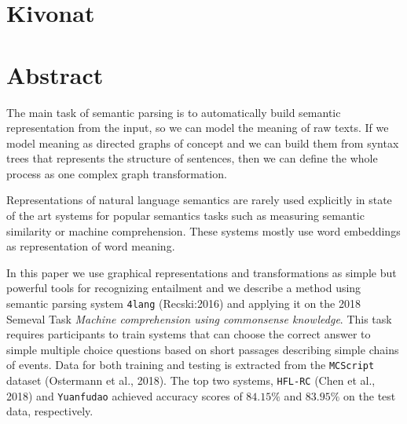 \chapter*{Kivonat}



\vfill

\chapter*{Abstract}
The main task of semantic parsing is to automatically build semantic representation from the input, so we can model the meaning
of raw texts. If we model meaning as directed graphs of concept and we can build them from syntax trees that represents the structure of 
sentences, then we can define the whole process as one complex graph transformation.

Representations of natural language semantics
are rarely used explicitly in state of the art systems
for popular semantics tasks such as measuring semantic
similarity or machine comprehension. These systems mostly use word embeddings as representation of word meaning.

In this paper we use graphical representations and transformations as simple but powerful tools for recognizing entailment and we describe a method using semantic parsing system \texttt{4lang} (Recski:2016) and applying it on
the 2018 Semeval Task \textit{Machine comprehension using commonsense
knowledge}. This task 
requires participants
to train systems that can choose the correct
answer to simple multiple choice questions
based on short passages describing simple chains
of events. Data for both training and testing is extracted
from the \texttt{MCScript} dataset (Ostermann
et al., 2018). The top two systems, \texttt{HFL-RC} (Chen
et al., 2018) and \texttt{Yuanfudao}
achieved accuracy scores of $84.15\%$ and $83.95\%$
on the test data, respectively.

